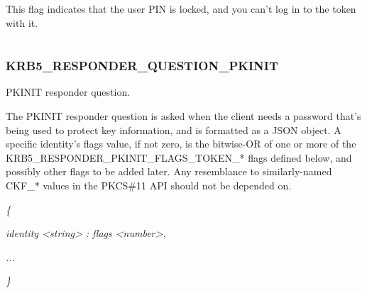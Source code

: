 \documentclass[letterpaper,10pt,english]{sphinxmanual}
\begin{document}
\begin{fulllineitems}
\label{appdev/refs/macros/KRB5_RESPONDER_PKINIT_FLAGS_TOKEN_USER_PIN_LOCKED:KRB5_RESPONDER_PKINIT_FLAGS_TOKEN_USER_PIN_LOCKED}
\end{fulllineitems}


This flag indicates that the user PIN is locked, and you can't log in to the token with it.

\begin{tabulary}{\linewidth}{|L|L|}
\hline

 & 
\\
\hline\end{tabulary}



\subsubsection{KRB5\_RESPONDER\_QUESTION\_PKINIT}
\label{appdev/refs/macros/KRB5_RESPONDER_QUESTION_PKINIT:krb5-responder-question-pkinit}\label{appdev/refs/macros/KRB5_RESPONDER_QUESTION_PKINIT:krb5-responder-question-pkinit-data}\label{appdev/refs/macros/KRB5_RESPONDER_QUESTION_PKINIT::doc}

\begin{fulllineitems}
\label{appdev/refs/macros/KRB5_RESPONDER_QUESTION_PKINIT:KRB5_RESPONDER_QUESTION_PKINIT}
\end{fulllineitems}


PKINIT responder question.

The PKINIT responder question is asked when the client needs a password that's being used to protect key information, and is formatted as a JSON object. A specific identity's flags value, if not zero, is the bitwise-OR of one or more of the KRB5\_RESPONDER\_PKINIT\_FLAGS\_TOKEN\_* flags defined below, and possibly other flags to be added later. Any resemblance to similarly-named CKF\_* values in the PKCS\#11 API should not be depended on.

\emph{\{}

\emph{identity \textless{}string\textgreater{} : flags \textless{}number\textgreater{},}

\emph{...}

\emph{\}}
\end{document}
